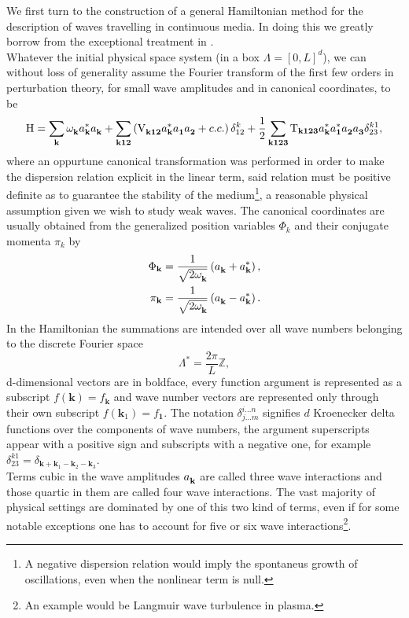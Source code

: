 We first turn to the construction of a general Hamiltonian method for the description of waves travelling in continuous media. In doing this
we greatly borrow from the exceptional treatment in \cite{Zakharov}. \\
Whatever the initial physical space system (in a box $\Lambda = [0,L]^d$), we can without loss of generality assume the Fourier transform of the first few orders in 
perturbation theory, for small wave amplitudes and in canonical coordinates, to be
\begin{equation}
    \mathrm{H} = \sum_\mathbf{k} \omega^{}_\mathbf{k} a_\mathbf{k}^{*} a_\mathbf{k}^{} + \sum_{\mathbf{k12}} \left( \mathrm{V}_{\mathbf{k12}}^{} a_\mathbf{k}^{*}a_\mathbf{1}^{}a_\mathbf{2}^{} + c.c.  \right)\delta^{k}_{12} \\
    +\frac{1}{2}\sum_{\mathbf{k123}} \mathrm{T}_{\mathbf{k123}} a_\mathbf{k}^{*}a_\mathbf{1}^{*}a_\mathbf{2}^{}a_\mathbf{3}^{}\delta^{k1}_{23},
    \label{HamOrig}
\end{equation}
where an oppurtune canonical transformation was performed in order to make the dispersion relation explicit in the linear term, said relation must be positive definite 
as to guarantee the stability of the medium\footnote{A negative dispersion relation would imply the spontaneus growth of oscillations, even when the nonlinear
term is null.}, a reasonable physical assumption given we wish to study weak waves. The canonical coordinates are usually obtained from the generalized position
variables $\Phi_k$ and their conjugate momenta $\pi_k$ by
\begin{align*}
    \Phi_\mathbf{k} &= \frac{1}{\sqrt{2\omega^{}_{\mathbf{k}}}}\left(a_\mathbf{k}^{} + a_\mathbf{k}^{*}\right) , \\
    \pi_\mathbf{k} &= \frac{1}{\sqrt{2\omega^{}_{\mathbf{k}}}}\left(a_\mathbf{k}^{} - a_\mathbf{k}^{*} \right) .
\end{align*}
In the Hamiltonian the summations are intended over all wave numbers belonging to the discrete Fourier space 
\begin{equation}
    \Lambda^* = \frac{2\pi}{L}\mathbb{Z},
\end{equation}
d-dimensional vectors are in boldface, every function argument is represented as a subscript $f(\mathbf{k})=f_\mathbf{k}$ and wave number vectors are 
represented only through their own subscript $f(\mathbf{k}_1)=f_\mathbf{1}$. The notation $\delta^{i\dots n}_{j \dots m}$ signifies $d$ Kroenecker delta functions over the components of 
wave numbers, 
the argument superscripts appear with a positive sign and subscripts with a negative one, for example $\delta^{k1}_{23} = \delta_{\mathbf{k} + \mathbf{k}_1 - 
\mathbf{k}_2 - \mathbf{k}_3}$.\\
Terms cubic in the wave amplitudes $a_\mathbf{k}^{}$ are called three wave interactions and those quartic in them are called four wave interactions. The vast majority of physical 
settings are dominated by one of this two kind of terms, even if for some notable exceptions one has to account for five or six wave interactions\footnote{An example would be
Langmuir wave turbulence in plasma.}. \\

